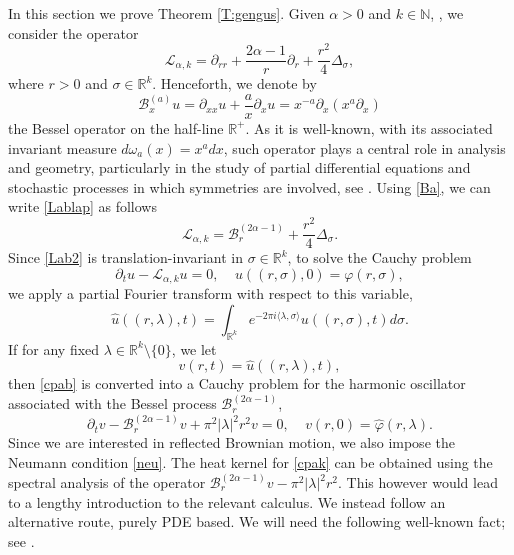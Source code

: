 \documentclass[11pt,a4paper]{amsart}
\def \R {\mathbb{R}}
\newcommand{\Ba}{\mathscr B_x^{(a)}}
\newcommand{\Barr}{\mathscr B_r^{(2\alpha-1)}}
\def \vf{\varphi}
\newcommand{\p}{\partial}
\newcommand{\la}{\lambda}
\numberwithin{equation}{section}
\newcommand{\sa}{\langle}
\newcommand{\da}{\rangle}
\numberwithin{equation}{section}
\begin{document}
In this section we prove Theorem \ref{T:gengus}. Given $\alpha >0$ and $k\in \mathbb N$, , we consider the operator
\begin{equation}\label{Lablap}
\mathscr L_{\alpha,k} = \p_{rr} + \frac{2\alpha-1}{r} \p_r + \frac{r^2}{4}\Delta_\sigma,
\end{equation}
where $r> 0$ and $\sigma\in \R^k$.
Henceforth, we denote by
\begin{equation}\label{Ba}
\Ba u = \p_{xx} u + \frac a{x} \p_x u = x^{-a} \p_x(x^a \p_x)
\end{equation}
the Bessel operator on the half-line $\R^+$. As it is well-known, with its associated invariant measure $d\omega_a(x) = x^a dx$, such operator
plays a central role in analysis and geometry, particularly in the study of partial differential equations and stochastic processes in which symmetries are involved, see \cite{We1, We, We2, MS, Ta, MO, IM, KT}. Using \eqref{Ba}, we can write \eqref{Lablap} as follows
\begin{equation}\label{Lab2}
\mathscr L_{\alpha,k} = \Barr + \frac{r^2}{4}  \Delta_\sigma.
\end{equation} 
Since \eqref{Lab2} is translation-invariant in $\sigma\in \R^k$, to solve the Cauchy problem
\begin{equation}\label{cpab}
\p_t u - \mathscr L_{\alpha,k} u = 0,\ \ \ \ \ u((r,\sigma),0) = \vf(r,\sigma),
\end{equation}
we apply a partial Fourier transform with respect to this variable,
\[
\hat u((r,\la),t) = \int_{\R^k} e^{-2\pi i\sa\la,\sigma\da} u((r,\sigma),t)d\sigma.
\]
If for any fixed $\la\in\R^k\setminus\{0\}$, we let
\[
v(r,t) = \hat u((r,\la),t),
\]
then \eqref{cpab} is converted into a Cauchy problem for the harmonic oscillator associated with the Bessel process $\Barr$,
\begin{equation}\label{cpak}
\p_t v - \Barr v + \pi^2|\la|^2 r^2 v = 0,\ \ \ \ \ v(r,0) = \hat \vf(r,\la).
\end{equation}  
Since we are interested in reflected Brownian motion, we also impose the Neumann condition \eqref{neu}. The heat kernel for \eqref{cpak} can be obtained using the spectral analysis of the operator $\Barr v - \pi^2|\la|^2 r^2$. This however would lead to a lengthy introduction to the relevant calculus. We instead follow an alternative route, purely PDE based. We will need the following well-known fact; see \cite{OU, BGV, SS, Bo2, Wil}.
\end{document}
